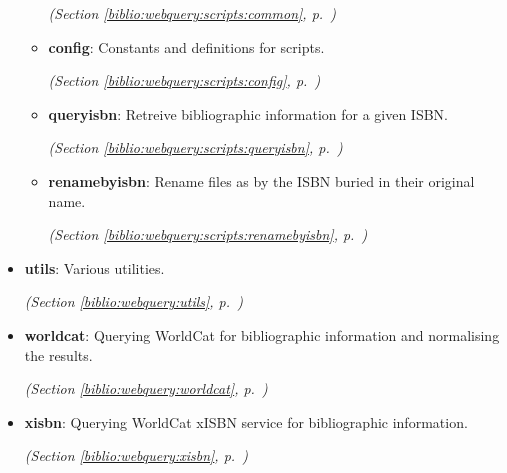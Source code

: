 \begin{itemize}
\begin{itemize}
  \textit{(Section \ref{biblio:webquery:scripts:common}, p.~\pageref{biblio:webquery:scripts:common})}

    \item \textbf{config}: 
Constants and definitions for scripts.


  \textit{(Section \ref{biblio:webquery:scripts:config}, p.~\pageref{biblio:webquery:scripts:config})}

    \item \textbf{queryisbn}: 
Retreive bibliographic information for a given ISBN.


  \textit{(Section \ref{biblio:webquery:scripts:queryisbn}, p.~\pageref{biblio:webquery:scripts:queryisbn})}

    \item \textbf{renamebyisbn}: 
Rename files as by the ISBN buried in their original name.


  \textit{(Section \ref{biblio:webquery:scripts:renamebyisbn}, p.~\pageref{biblio:webquery:scripts:renamebyisbn})}

  \end{itemize}
\item \textbf{utils}: 
Various utilities.


  \textit{(Section \ref{biblio:webquery:utils}, p.~\pageref{biblio:webquery:utils})}

\item \textbf{worldcat}: 
Querying WorldCat for bibliographic information and normalising the results.


  \textit{(Section \ref{biblio:webquery:worldcat}, p.~\pageref{biblio:webquery:worldcat})}

\item \textbf{xisbn}: 
Querying WorldCat xISBN service for bibliographic information.


  \textit{(Section \ref{biblio:webquery:xisbn}, p.~\pageref{biblio:webquery:xisbn})}

\end{itemize}

